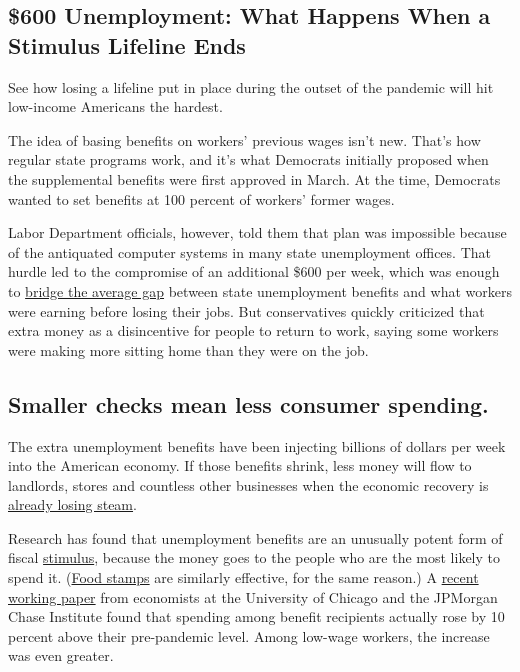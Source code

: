 \hypertarget{600-unemployment-what-happens-when-a-stimulus-lifeline-ends}{%
\subsection{\$600 Unemployment: What Happens When a Stimulus Lifeline
Ends}\label{600-unemployment-what-happens-when-a-stimulus-lifeline-ends}}

See how losing a lifeline put in place during the outset of the pandemic
will hit low-income Americans the hardest.

The idea of basing benefits on workers' previous wages isn't new. That's
how regular state programs work, and it's what Democrats initially
proposed when the supplemental benefits were first approved in March. At
the time, Democrats wanted to set benefits at 100 percent of workers'
former wages.

Labor Department officials, however, told them that plan was impossible
because of the antiquated computer systems in many state unemployment
offices. That hurdle led to the compromise of an additional \$600 per
week, which was enough to
\href{https://www.nytimes3xbfgragh.onion/interactive/2020/04/23/business/economy/unemployment-benefits-stimulus-coronavirus.html}{bridge
the average gap} between state unemployment benefits and what workers
were earning before losing their jobs. But conservatives quickly
criticized that extra money as a disincentive for people to return to
work, saying some workers were making more sitting home than they were
on the job.

\hypertarget{smaller-checks-mean-less-consumer-spending}{%
\subsection{Smaller checks mean less consumer
spending.}\label{smaller-checks-mean-less-consumer-spending}}

The extra unemployment benefits have been injecting billions of dollars
per week into the American economy. If those benefits shrink, less money
will flow to landlords, stores and countless other businesses when the
economic recovery is
\href{https://www.nytimes3xbfgragh.onion/2020/07/15/business/economy/economic-recovery-coronavirus-resurgence.html}{already
losing steam}.

Research has found that unemployment benefits are an unusually potent
form of fiscal
\href{https://www.nytimes3xbfgragh.onion/2020/08/13/business/economy/unemployment-benefits-coronavirus.html}{stimulus},
because the money goes to the people who are the most likely to spend
it.
(\href{https://www.nytimes3xbfgragh.onion/2020/07/17/your-money/food-stamps-coronavirus.html}{Food
stamps} are similarly effective, for the same reason.) A
\href{https://institute.jpmorganchase.com/institute/research/labor-markets/report-consumption-effects-of-unemployment-insurance-during-the-covid-19-pandemic}{recent
working paper} from economists at the University of Chicago and the
JPMorgan Chase Institute found that spending among benefit recipients
actually rose by 10 percent above their pre-pandemic level. Among
low-wage workers, the increase was even greater.

